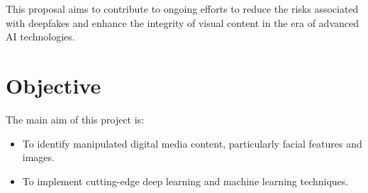         This proposal aims to contribute to ongoing efforts to reduce the risks associated with deepfakes and enhance the integrity of visual content in the era of advanced AI technologies.
       \section{Objective}
            The main aim of this project is:
            \begin{itemize}
                \item To identify manipulated digital media content, particularly facial features and images.
                \item To implement cutting-edge deep learning and machine learning techniques.
            \end{itemize}